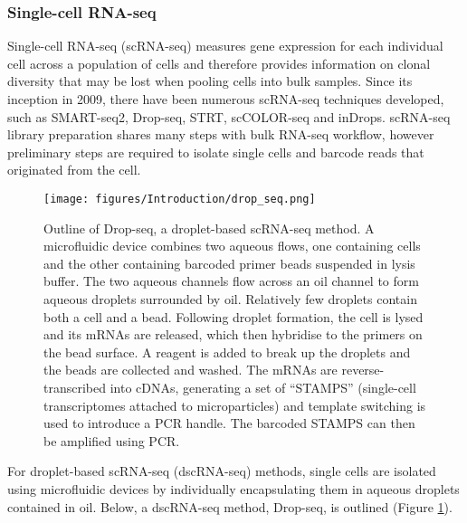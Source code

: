 \subsubsection{Single-cell RNA-seq}
Single-cell RNA-seq (scRNA-seq) measures gene expression for each individual cell across a population of cells and therefore provides information on clonal diversity that may be lost when pooling cells into bulk samples.
Since its inception in 2009\cite{tang2009mrna}, there have been numerous scRNA-seq techniques developed, such as SMART-seq2\cite{picelli2013smart}, Drop-seq\cite{macosko2015highly}, STRT\cite{islam2011characterization}, scCOLOR-seq\cite{philpott2021nanopore} and inDrops\cite{klein2015droplet}.
scRNA-seq library preparation shares many steps with bulk RNA-seq workflow, however preliminary steps are required to isolate single cells and barcode reads that originated from the cell.
\begin{figure}[hb]
\centering
\texttt{[image: figures/Introduction/drop\_seq.png]}
\caption[Drop-seq schematic]{Outline of Drop-seq, a droplet-based scRNA-seq method.
A microfluidic device combines two aqueous flows, one containing cells and the other containing barcoded primer beads suspended in lysis buffer.
The two aqueous channels flow across an oil channel to form aqueous droplets surrounded by oil.
Relatively few droplets contain both a cell and a bead.
Following droplet formation, the cell is lysed and its mRNAs are released, which then hybridise to the primers on the bead surface.
A reagent is added to break up the droplets and the beads are collected and washed.
The mRNAs are reverse-transcribed into cDNAs, generating a set of ``STAMPS'' (single-cell transcriptomes attached to microparticles) and template switching is used to introduce a PCR handle.
The barcoded STAMPS can then be amplified using PCR.}
\label{fig:dropseq}\end{figure}
For droplet-based scRNA-seq (dscRNA-seq) methods, single cells are isolated using microfluidic devices by individually encapsulating them in aqueous droplets contained in oil.
Below, a dscRNA-seq method, Drop-seq, is outlined (Figure \ref{fig:dropseq}).




